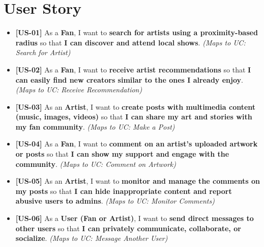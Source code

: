 \documentclass[11pt]{report}
\begin{document}
\chapter{User Story}


\begin{itemize}
  \item \textbf{[US-01]} As a \textbf{Fan}, I want to \textbf{search for artists using a proximity-based radius} so that \textbf{I can discover and attend local shows}. \textit{(Maps to UC: Search for Artist)}

  \item \textbf{[US-02]} As a \textbf{Fan}, I want to \textbf{receive artist recommendations} so that \textbf{I can easily find new creators similar to the ones I already enjoy}. \textit{(Maps to UC: Receive Recommendation)}

  \item \textbf{[US-03]} As an \textbf{Artist}, I want to \textbf{create posts with multimedia content (music, images, videos)} so that \textbf{I can share my art and stories with my fan community}. \textit{(Maps to UC: Make a Post)}

  \item \textbf{[US-04]} As a \textbf{Fan}, I want to \textbf{comment on an artist's uploaded artwork or posts} so that \textbf{I can show my support and engage with the community}. \textit{(Maps to UC: Comment on Artwork)}

  \item \textbf{[US-05]} As an \textbf{Artist}, I want to \textbf{monitor and manage the comments on my posts} so that \textbf{I can hide inappropriate content and report abusive users to admins}. \textit{(Maps to UC: Monitor Comments)}

  \item \textbf{[US-06]} As a \textbf{User (Fan or Artist)}, I want to \textbf{send direct messages to other users} so that \textbf{I can privately communicate, collaborate, or socialize}. \textit{(Maps to UC: Message Another User)}


\end{itemize}
\end{document}
